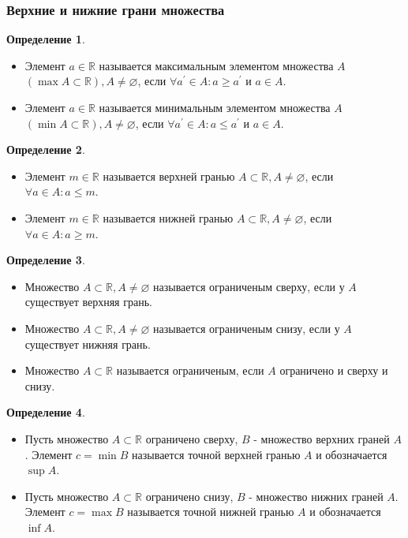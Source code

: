 \documentclass[a4paper, 12pt]{article}
\newcommand{\R}{\mathbb{R}}
\renewcommand{\emptyset}{\varnothing}
\newcommand\tab[1][.5cm]{\hspace*{#1}}
\theoremstyle{definition}
\newtheorem*{definition}{Определение}
\begin{document}
        \subsubsection{Верхние и нижние грани множества}
        \begin{definition} \tab
            \begin{itemize}
                \item Элемент $a\in \R$ называется максимальным элементом множества $A$\\ $(\max A\subset \R), A\ne \emptyset$, если $\forall a^{\prime}\in A: a\geq a^{\prime}$ и $a\in A$.
                \item Элемент $a\in \R$ называется минимальным элементом множества $A$\\ $(\min A\subset \R), A\ne \emptyset$, если $\forall a^{\prime}\in A: a\leq a^{\prime}$ и $a\in A$.
            \end{itemize}
        \end{definition}
        \begin{definition} \tab
            \begin{itemize}
                \item Элемент $m\in \R$ называется верхней гранью $A\subset \R, A\ne \emptyset$, если\\ $\forall a\in A: a\leq m$.
                \item Элемент $m\in \R$ называется нижней гранью $A\subset \R, A\ne \emptyset$, если\\ $\forall a\in A: a\geq m$.
            \end{itemize}
        \end{definition}
        \begin{definition} \tab
            \begin{itemize}
                \item Множество $A \subset \R, A\ne \emptyset$ называется ограниченым сверху, если у $A$ существует верхняя грань.
                \item Множество $A \subset \R, A\ne \emptyset$ называется ограниченым снизу, если у $A$ существует нижняя грань.
                \item Множество $A \subset \R$ называется ограниченым, если $A$ ограничено и сверху и снизу.
            \end{itemize}
        \end{definition}
        \begin{definition} \tab
            \begin{itemize}
                \item Пусть множество $A \subset \R$ ограничено сверху, $B$ - множество верхних граней $A$. Элемент $c=\min B$ называется точной верхней гранью $A$ и обозначается $\sup A$.
                \item Пусть множество $A \subset \R$ ограничено снизу, $B$ - множество нижних граней $A$. Элемент $c=\max B$ называется точной нижней гранью $A$ и обозначается $\inf A$.
            \end{itemize}
        \end{definition}
\end{document}
